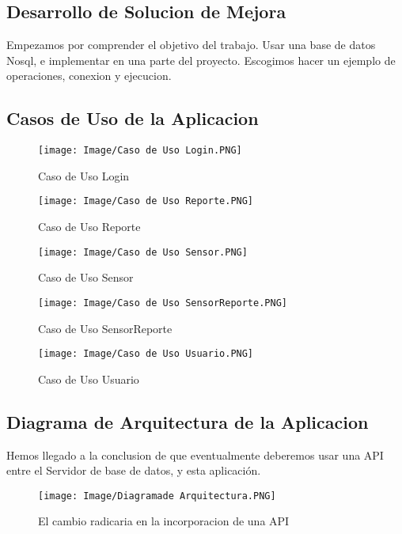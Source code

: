 \documentclass[twoside,twocolumn]{article}
\begin{document}
\begin{itemize}
\clearpage
\section{Desarrollo de Solucion de Mejora}
Empezamos por comprender el objetivo del trabajo. Usar una base de datos Nosql, e implementar en una parte del proyecto.
Escogimos hacer un ejemplo de operaciones, conexion y ejecucion.
\subsection{Casos de Uso de la Aplicacion}

\begin{figure}[h!]
\centering
\texttt{[image: Image/Caso de Uso Login.PNG]}
\caption{Caso de Uso Login}
\label{fig:Csha3}
\end{figure}

\begin{figure}[h!]
\centering
\texttt{[image: Image/Caso de Uso Reporte.PNG]}
\caption{Caso de Uso Reporte}
\label{fig:Csha3}
\end{figure}

\begin{figure}[h!]
\centering
\texttt{[image: Image/Caso de Uso Sensor.PNG]}
\caption{Caso de Uso Sensor}
\label{fig:Csha3}
\end{figure}

\begin{figure}[h!]
\centering
\texttt{[image: Image/Caso de Uso SensorReporte.PNG]}
\caption{Caso de Uso SensorReporte}
\label{fig:Csha3}
\end{figure}

\begin{figure}[h!]
\centering
\texttt{[image: Image/Caso de Uso Usuario.PNG]}
\caption{Caso de Uso Usuario}
\label{fig:Csha3}
\end{figure}

\clearpage
\subsection{Diagrama de Arquitectura de la Aplicacion}
Hemos llegado a la conclusion de que eventualmente deberemos usar una API entre el Servidor de base de datos, y esta aplicación.

\begin{figure}[h!]
\centering
\texttt{[image: Image/Diagramade Arquitectura.PNG]}
\caption{El cambio radicaria en la incorporacion de una API}
\label{fig:Csha3}
\end{figure}


\end{itemize}
\end{document}
